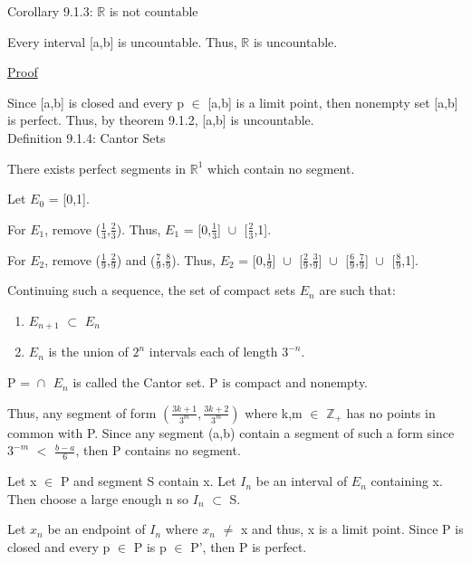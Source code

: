 { \color{orange} Corollary 9.1.3: $\mathbb{R}$ is not countable } 

	\begin{adjustbox}{minipage=14cm, right, vspace=0.1cm 0cm}
		Every interval [a,b] is uncountable.
		Thus, $\mathbb{R}$ is uncountable.
	\end{adjustbox}

{ \color{magenta} \underline{Proof} }

	Since [a,b] is closed and every p $\in$ [a,b] is a limit point,
	then nonempty set [a,b] is perfect.
	Thus, by {\color{red} theorem 9.1.2}, [a,b] is uncountable. \\

{ \color{blue} Definition 9.1.4: Cantor Sets } 

	\begin{adjustbox}{minipage=14cm, right, vspace=0.1cm 0cm}
		There exists perfect segments in $\mathbb{R}^1$ which contain no segment.

		Let $E_0$ = [0,1].

		For $E_1$, remove ($\frac{1}{3}$,$\frac{2}{3}$).
		Thus, $E_1$ = [0,$\frac{1}{3}$] $\cup_{}^{}$ [$\frac{2}{3}$,1].

		For $E_2$, remove ($\frac{1}{9}$,$\frac{2}{9}$) and ($\frac{7}{9}$,$\frac{8}{9}$).
		Thus, $E_2$ = [0,$\frac{1}{9}$] $\cup_{}^{}$ [$\frac{2}{9}$,$\frac{3}{9}$] $\cup_{}^{}$
		[$\frac{6}{9}$,$\frac{7}{9}$] $\cup_{}^{}$ [$\frac{8}{9}$,1].

		Continuing such a sequence, the set of compact sets $E_n$ are such that:

		\begin{enumerate}[label=(\alph*), leftmargin=2cm, itemsep=0.1cm]
			\item $E_{n+1}$ $\subset$ $E_n$
			\item $E_n$ is the union of $2^n$ intervals each of length $3^{-n}$.
		\end{enumerate}

		P = $\cap_{}^{}$ $E_n$ is called the Cantor set.
		P is compact and nonempty.

		Thus, any segment of form $(\frac{3k+1}{3^m},\frac{3k+2}{3^m})$
		where k,m $\in$ $\mathbb{Z}_+$ has no points in common with P.
		Since any segment (a,b) contain a segment of such a form since
		$3^{-m}$ $<$ $\frac{b-a}{6}$, then P contains no segment.

		Let x $\in$ P and segment S contain x. Let $I_n$ be an interval of
		$E_n$ containing x. Then choose a large enough n so $I_n$ $\subset$ S.
		
		Let $x_n$ be an endpoint of $I_n$ where $x_n$ $\not =$ x and thus,
		x is a limit point. Since P is closed and every p $\in$ P is p $\in$ P',
		then P is perfect.
	\end{adjustbox}

